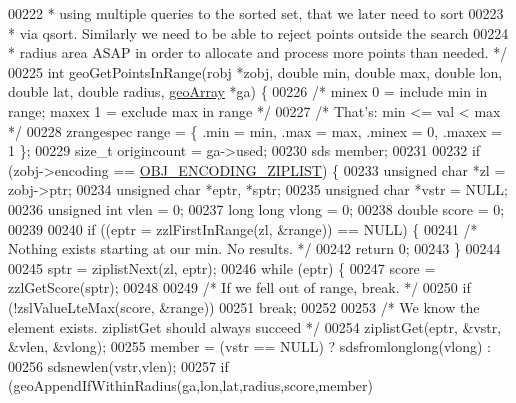 \begin{DoxyCode}
{{00222 \textcolor{comment}{ * using multiple queries to the sorted set, that we later need to sort}
00223 \textcolor{comment}{ * via qsort. Similarly we need to be able to reject points outside the search}
00224 \textcolor{comment}{ * radius area ASAP in order to allocate and process more points than needed. */}
00225 \textcolor{keywordtype}{int} geoGetPointsInRange(robj *zobj, \textcolor{keywordtype}{double} min, \textcolor{keywordtype}{double} max, \textcolor{keywordtype}{double} lon, \textcolor{keywordtype}{double} lat, \textcolor{keywordtype}{double} radius, 
      \hyperlink{structgeoArray}{geoArray} *ga) \{
00226     \textcolor{comment}{/* minex 0 = include min in range; maxex 1 = exclude max in range */}
00227     \textcolor{comment}{/* That's: min <= val < max */}
00228     zrangespec range = \{ .min = min, .max = max, .minex = 0, .maxex = 1 \};
00229     size\_t origincount = ga->used;
00230     sds member;
00231 
00232     \textcolor{keywordflow}{if} (zobj->encoding == \hyperlink{server_8h_aabf064ede983103f1fd0df2086e84eee}{OBJ\_ENCODING\_ZIPLIST}) \{
00233         \textcolor{keywordtype}{unsigned} \textcolor{keywordtype}{char} *zl = zobj->ptr;
00234         \textcolor{keywordtype}{unsigned} \textcolor{keywordtype}{char} *eptr, *sptr;
00235         \textcolor{keywordtype}{unsigned} \textcolor{keywordtype}{char} *vstr = NULL;
00236         \textcolor{keywordtype}{unsigned} \textcolor{keywordtype}{int} vlen = 0;
00237         \textcolor{keywordtype}{long} \textcolor{keywordtype}{long} vlong = 0;
00238         \textcolor{keywordtype}{double} score = 0;
00239 
00240         \textcolor{keywordflow}{if} ((eptr = zzlFirstInRange(zl, &range)) == NULL) \{
00241             \textcolor{comment}{/* Nothing exists starting at our min.  No results. */}
00242             \textcolor{keywordflow}{return} 0;
00243         \}
00244 
00245         sptr = ziplistNext(zl, eptr);
00246         \textcolor{keywordflow}{while} (eptr) \{
00247             score = zzlGetScore(sptr);
00248 
00249             \textcolor{comment}{/* If we fell out of range, break. */}
00250             \textcolor{keywordflow}{if} (!zslValueLteMax(score, &range))
00251                 \textcolor{keywordflow}{break};
00252 
00253             \textcolor{comment}{/* We know the element exists. ziplistGet should always succeed */}
00254             ziplistGet(eptr, &vstr, &vlen, &vlong);
00255             member = (vstr == NULL) ? sdsfromlonglong(vlong) :
00256                                       sdsnewlen(vstr,vlen);
00257             \textcolor{keywordflow}{if} (geoAppendIfWithinRadius(ga,lon,lat,radius,score,member)
}}
\end{DoxyCode}
